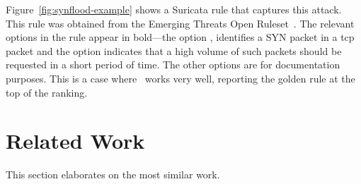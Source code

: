\documentclass[conference]{IEEEtran}
\begin{document}
Figure~\ref{fig:synflood-example} shows a Suricata rule that captures
this attack. This rule was obtained from the Emerging Threats Open
Ruleset~\cite{emerging-threats-open}. The relevant options in the
rule appear in bold---the option , identifies a
SYN packet in a tcp packet and the option  indicates that a high
volume of such packets should be requested in a short period of
time. The other options are for documentation purposes. This is a case
where \tname\ works very well, reporting the golden rule at the top
of the ranking.


\section{Related Work}

This section elaborates on the most similar work.
\end{document}
